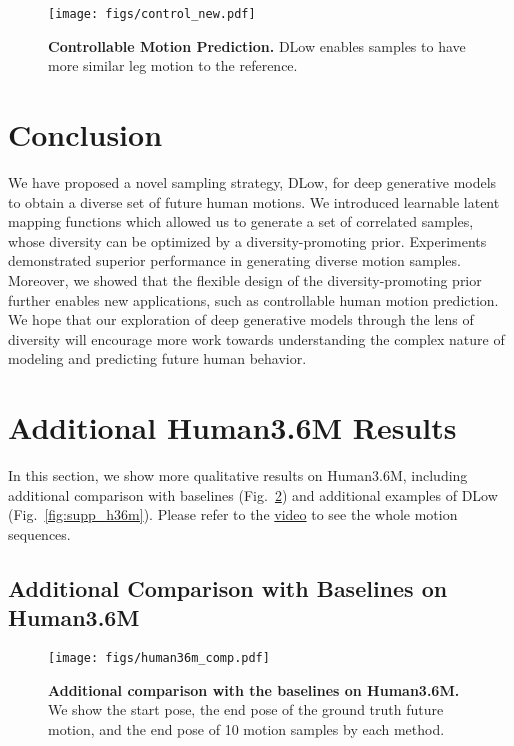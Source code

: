 \documentclass[runningheads]{llncs}
\begin{document}
	
	\begin{figure}[t]
		\centering
		\texttt{[image: figs/control\_new.pdf]}
		\vspace{-7mm}
		\caption{\textbf{Controllable Motion Prediction.} DLow enables samples to have more similar leg motion to the reference.}
		\label{fig:control}
		\vspace{-6mm}
	\end{figure}
	
	\vspace{-2mm}
	\section{Conclusion}
	\vspace{-1mm}
	We have proposed a novel sampling strategy, DLow, for deep generative models to obtain a diverse set of future human motions. We introduced learnable latent mapping functions which allowed us to generate a set of correlated samples, whose diversity can be optimized by a diversity-promoting prior. Experiments demonstrated superior performance in generating diverse motion samples. Moreover, we showed that the flexible design of the diversity-promoting prior further enables new applications, such as controllable human motion prediction. We hope that our exploration of deep generative models through the lens of diversity will encourage more work towards understanding the complex nature of modeling and predicting future human behavior.
	
	
	
	
	
	\appendix
	
\clearpage
\section{Additional Human3.6M Results}
In this section, we show more qualitative results on Human3.6M, including additional comparison with baselines (Fig.~\ref{fig:supp_h36m_comp}) and additional examples of DLow (Fig.~\ref{fig:supp_h36m}). Please refer to the \href{https://youtu.be/64OEdSadb00}{video} to see the whole motion sequences.
\vspace{-3mm}
\subsection{Additional Comparison with Baselines on Human3.6M}
\begin{figure}[ht!]
    \vspace{-7mm}
    \centering
    \texttt{[image: figs/human36m\_comp.pdf]}
    \vspace{-5mm}
    \caption{\textbf{Additional comparison with the baselines on Human3.6M.} We show the start pose, the end pose of the ground truth future motion, and the end pose of 10 motion samples by each method.}
    \label{fig:supp_h36m_comp}
\end{figure}
\end{document}
